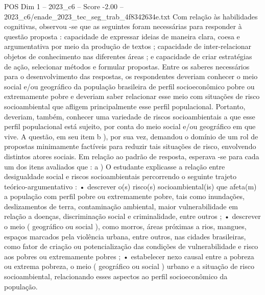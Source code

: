 \begin{textsample}{POS Dim 1 – 2023\_c6 – Score -2.00 – 2023\_c6/enade\_2023\_tec\_seg\_trab\_4f8342634e.txt}
Com relação às habilidades cognitivas, observou -se que as seguintes foram necessárias para responder à questão proposta : capacidade de expressar ideias de maneira clara, coesa e argumentativa por meio da produção de textos ; capacidade de inter-relacionar objetos de conhecimento nas diferentes áreas ; e capacidade de criar estratégias de ação, selecionar métodos e formular propostas.
Entre os saberes necessários para o desenvolvimento das respostas, os respondentes deveriam conhecer o meio social e/ou geográfico da população brasileira de perfil socioeconômico pobre ou extremamente pobre e deveriam saber relacionar esse meio com situações de risco socioambiental que afligem principalmente esse perfil populacional.
Portanto, deveriam, também, conhecer uma variedade de riscos socioambientais a que esse perfil populacional está sujeito, por conta do meio social e/ou geográfico em que vive.
A questão, em seu item b ), por sua vez, demandou o domínio de um rol de propostas minimamente factíveis para reduzir tais situações de risco, envolvendo distintos atores sociais.
Em relação ao padrão de resposta, esperava -se para cada um dos itens avaliados que : a ) O estudante explicasse a relação entre desigualdade social e riscos socioambientais percorrendo o seguinte trajeto teórico-argumentativo : • descrever o(s) risco(s) socioambiental(is) que afeta(m) a população com perfil pobre ou extremamente pobre, tais como inundações, deslizamentos de terra, contaminação ambiental, maior vulnerabilidade em relação a doenças, discriminação social e criminalidade, entre outros ; • descrever o meio ( geográfico ou social ), como morros, áreas próximas a rios, mangues, espaços marcados pela violência urbana, entre outros, nas cidades brasileiras, como fator de criação ou potencialização das condições de vulnerabilidade e risco aos pobres ou extremamente pobres ; • estabelecer nexo causal entre a pobreza ou extrema pobreza, o meio ( geográfico ou social ) urbano e a situação de risco socioambiental, relacionando esses aspectos ao perfil socioeconômico da população.

\end{textsample}
